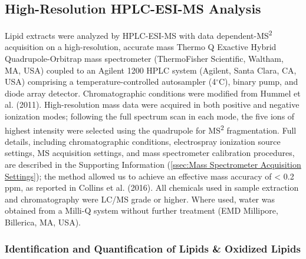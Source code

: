 \subsection{High-Resolution HPLC-ESI-MS Analysis}

Lipid extracts were analyzed by HPLC-ESI-MS with data dependent-MS\textsuperscript{2} acquisition on a high-resolution, accurate mass Thermo Q Exactive Hybrid Quadrupole-Orbitrap mass spectrometer (ThermoFisher Scientific, Waltham, MA, USA) coupled to an Agilent 1200 HPLC system (Agilent, Santa Clara, CA, USA) comprising a temperature-controlled autosampler (4$^{\circ}$C), binary pump, and diode array detector. Chromatographic conditions were modified from Hummel et al. (2011). High-resolution mass data were acquired in both positive and negative ionization modes; following the full spectrum scan in each mode, the five ions of highest intensity were selected using the quadrupole for MS\textsuperscript{2} fragmentation. Full details, including chromatographic conditions, electrospray ionization source settings, MS acquisition settings, and mass spectrometer calibration procedures, are described in the Supporting Information (\autoref{ssec:Mass Spectrometer Acquisition Settings}); the method allowed us to achieve an effective mass accuracy of \textless{} 0.2 ppm, as reported in Collins et al. (2016). All chemicals used in sample extraction and chromatography were LC/MS grade or higher. Where used, water was obtained from a Milli-Q system without further treatment (EMD Millipore, Billerica, MA, USA).

\subsubsection{Identification and Quantification of Lipids \& Oxidized Lipids}
\label{sssec:Chap 4 - Identification and Quantification of Lipids and Oxidized Lipids}

